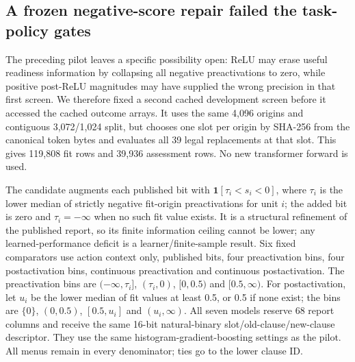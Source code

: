 \documentclass[
  british,
  11pt,
  a4paper,
]{article}
\newcounter{none} %
\begin{document}
\subsection{A frozen negative-score repair failed the task-policy
gates}\label{a-frozen-negative-score-repair-failed-the-task-policy-gates}

The preceding pilot leaves a specific possibility open: ReLU may erase
useful readiness information by collapsing all negative preactivations
to zero, while positive post-ReLU magnitudes may have supplied the wrong
precision in that first screen. We therefore fixed a second cached
development screen before it accessed the cached outcome arrays. It uses
the same 4,096 origins and contiguous 3,072/1,024 split, but chooses one
slot per origin by SHA-256 from the canonical token bytes and evaluates
all 39 legal replacements at that slot. This gives 119,808 fit rows and
39,936 assessment rows. No new transformer forward is used.

The candidate augments each published bit with
\(\mathbf 1[\tau_i<s_i<0]\), where \(\tau_i\) is the lower median of
strictly negative fit-origin preactivations for unit \(i\); the added
bit is zero and \(\tau_i=-\infty\) when no such fit value exists. It is
a structural refinement of the published report, so its finite
information ceiling cannot be lower; any learned-performance deficit is
a learner/finite-sample result. Six fixed comparators use action context
only, published bits, four preactivation bins, four postactivation bins,
continuous preactivation and continuous postactivation. The
preactivation bins are \((-\infty,\tau_i]\), \((\tau_i,0)\), \([0,0.5)\)
and \([0.5,\infty)\). For postactivation, let \(u_i\) be the lower
median of fit values at least 0.5, or 0.5 if none exist; the bins are
\(\{0\}\), \((0,0.5)\), \([0.5,u_i]\) and \((u_i,\infty)\). All seven
models reserve 68 report columns and receive the same 16-bit
natural-binary slot/old-clause/new-clause descriptor. They use the same
histogram-gradient-boosting settings as the pilot. All menus remain in
every denominator; ties go to the lower clause ID.
\end{document}

